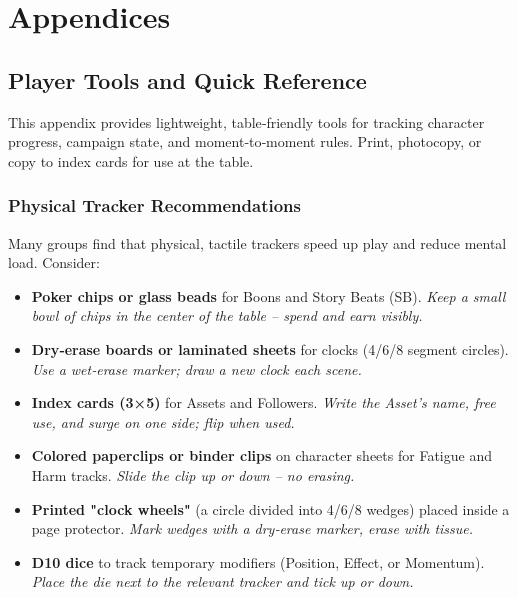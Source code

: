 \chapter{Appendices}


\section{Player Tools and Quick Reference}
\label{app:player-tools}

This appendix provides lightweight, table‑friendly tools for tracking character progress, campaign state, and moment‑to‑moment rules. Print, photocopy, or copy to index cards for use at the table.

\subsection{Physical Tracker Recommendations}

Many groups find that physical, tactile trackers speed up play and reduce mental load. Consider:

\begin{itemize}
  \item \textbf{Poker chips or glass beads} for Boons and Story Beats (SB).  
  \emph{Keep a small bowl of chips in the center of the table -- spend and earn visibly.}
  \item \textbf{Dry‑erase boards or laminated sheets} for clocks (4/6/8 segment circles).  
  \emph{Use a wet‑erase marker; draw a new clock each scene.}
  \item \textbf{Index cards (3×5)} for Assets and Followers.  
  \emph{Write the Asset's name, free use, and surge on one side; flip when used.}
  \item \textbf{Colored paperclips or binder clips} on character sheets for Fatigue and Harm tracks.  
  \emph{Slide the clip up or down -- no erasing.}
  \item \textbf{Printed "clock wheels"} (a circle divided into 4/6/8 wedges) placed inside a page protector.  
  \emph{Mark wedges with a dry‑erase marker, erase with tissue.}
  \item \textbf{D10 dice} to track temporary modifiers (Position, Effect, or Momentum).  
  \emph{Place the die next to the relevant tracker and tick up or down.}
\end{itemize}


